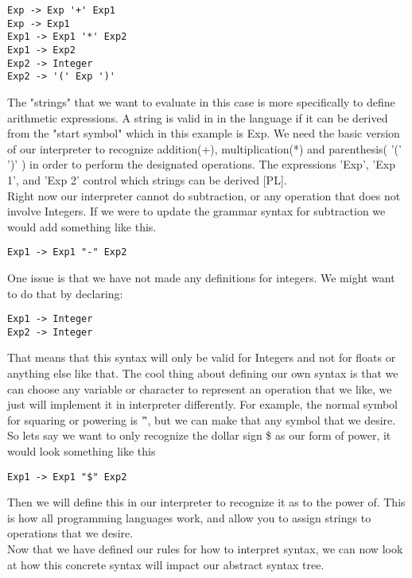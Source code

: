 \documentclass{article}
\begin{document}
\begin{lstlisting}
Exp -> Exp '+' Exp1
Exp -> Exp1
Exp1 -> Exp1 '*' Exp2
Exp1 -> Exp2
Exp2 -> Integer
Exp2 -> '(' Exp ')'
\end{lstlisting}

The "strings" that we want to evaluate in this case is more specifically to define arithmetic expressions. A string is valid in in the language if it can be derived from the "start symbol" which in this example is Exp.
We need the basic version of our interpreter to recognize addition(+), multiplication(*) and parenthesis( '(' ')' ) in order to perform the designated operations. The expressions 'Exp', 'Exp 1', and 'Exp 2' control which strings can be derived [PL].
\\
Right now our interpreter cannot do subtraction, or any operation that does not involve Integers. If we were to update the grammar syntax for subtraction we would add something like this.
\begin{lstlisting}
Exp1 -> Exp1 "-" Exp2
\end{lstlisting}
One issue is that we have not made any definitions for integers. We might want to do that by declaring:
\begin{lstlisting}
Exp1 -> Integer
Exp2 -> Integer
\end{lstlisting}
That means that this syntax will only be valid for Integers and not for floats or anything else like that. The cool thing about defining our own syntax is that we can choose any variable or character to represent an operation that we like, we just will implement it in interpreter differently. For example, the normal symbol for squaring or powering is '\^', but we can make that any symbol that we desire. So lets say we want to only recognize the dollar sign \$ as our form of power, it would look something like this
\begin{lstlisting}
Exp1 -> Exp1 "$" Exp2
\end{lstlisting}
Then we will define this in our interpreter to recognize it as to the power of. This is how all programming languages work, and allow you to assign strings to operations that we desire.
\\
Now that we have defined our rules for how to interpret syntax, we can now look at how this concrete syntax will impact our abstract syntax tree.
\end{document}
